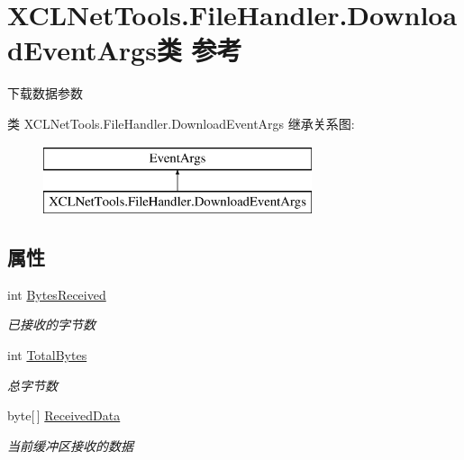 \hypertarget{class_x_c_l_net_tools_1_1_file_handler_1_1_download_event_args}{\section{X\-C\-L\-Net\-Tools.\-File\-Handler.\-Download\-Event\-Args类 参考}
\label{class_x_c_l_net_tools_1_1_file_handler_1_1_download_event_args}
}


下载数据参数  


类 X\-C\-L\-Net\-Tools.\-File\-Handler.\-Download\-Event\-Args 继承关系图\-:\begin{figure}[H]
\begin{center}
\leavevmode
\includegraphics[height=2.000000cm]{class_x_c_l_net_tools_1_1_file_handler_1_1_download_event_args}
\end{center}
\end{figure}
\subsection*{属性}
\begin{DoxyCompactItemize}
\item 
int \hyperlink{class_x_c_l_net_tools_1_1_file_handler_1_1_download_event_args_a1ea772d1ec4b2e0f1f3001fe069bac42}{Bytes\-Received}
\begin{DoxyCompactList}\small\item\em 已接收的字节数 \end{DoxyCompactList}\item 
int \hyperlink{class_x_c_l_net_tools_1_1_file_handler_1_1_download_event_args_a344cbcca5a213a50ecd25b90340be816}{Total\-Bytes}
\begin{DoxyCompactList}\small\item\em 总字节数 \end{DoxyCompactList}\item 
byte\mbox{[}$\,$\mbox{]} \hyperlink{class_x_c_l_net_tools_1_1_file_handler_1_1_download_event_args_ae080073b3629650c3befb398e9d7c2e8}{Received\-Data}
\begin{DoxyCompactList}\small\item\em 当前缓冲区接收的数据 \end{DoxyCompactList}\end{DoxyCompactItemize}


